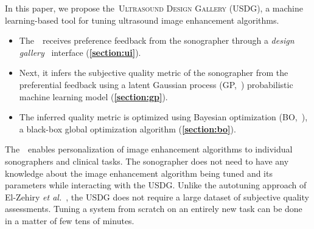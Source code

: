 In this paper, we propose the~\textsc{Ultrasound Design Gallery} (USDG), a machine learning-based tool for tuning ultrasound image enhancement algorithms.
\begin{itemize}
    \item[\ding{228}] The~\usdg~receives preference feedback from the sonographer through a \textit{design gallery}~\cite{brochu_bayesian_2010, 10.1145/3072959.3073598, koyama_sequential_2020, phan_color_2018, pmlr-v119-mikkola20a} interface (\textbf{\cref{section:ui}}).
    \vspace{0.02in}
  \item[\ding{228}] Next, it infers the subjective quality metric of the sonographer from the preferential feedback using a latent Gaussian process (GP,~\cite{rasmussen_gaussian_2006, pmlr-v119-mikkola20a}) probabilistic machine learning model (\textbf{\cref{section:gp}}).
    \vspace{0.02in}
  \item[\ding{228}] The inferred quality metric is optimized using Bayesian optimization (BO,~\cite{shahriari_taking_2016}), a black-box global optimization algorithm (\textbf{\cref{section:bo}}).
\end{itemize}
The~\usdg~enables personalization of image enhancement algorithms to individual sonographers and clinical tasks.
The sonographer does not need to have any knowledge about the image enhancement algorithm being tuned and its parameters while interacting with the USDG.
Unlike the autotuning approach of El-Zehiry \textit{et al.}~\cite{el-zehiry_learning_2013}, the USDG does not require a large dataset of subjective quality assessments.
Tuning a system from scratch on an entirely new task can be done in a matter of few tens of minutes.


